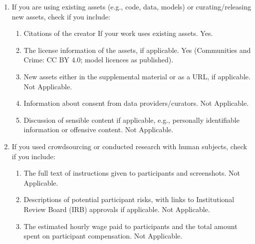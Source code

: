\documentclass[twoside]{article}
\theoremstyle{definition}
\theoremstyle{remark}
\newcommand{\1}{\mathbf{1}}
\begin{document}
\begin{enumerate}
\begin{enumerate}
  \end{enumerate}
  \item If you are using existing assets (e.g., code, data, models) or curating/releasing new assets, check if you include:
  \begin{enumerate}
    \item Citations of the creator If your work uses existing assets. Yes.
    \item The license information of the assets, if applicable. Yes (Communities and Crime: CC BY 4.0; model licences as published).
    \item New assets either in the supplemental material or as a URL, if applicable. Not Applicable.
    \item Information about consent from data providers/curators. Not Applicable.
    \item Discussion of sensible content if applicable, e.g., personally identifiable information or offensive content. Not Applicable.
  \end{enumerate}
  \item If you used crowdsourcing or conducted research with human subjects, check if you include:
  \begin{enumerate}
    \item The full text of instructions given to participants and screenshots. Not Applicable.
    \item Descriptions of potential participant risks, with links to Institutional Review Board (IRB) approvals if applicable. Not Applicable.
    \item The estimated hourly wage paid to participants and the total amount spent on participant compensation. Not Applicable.
  \end{enumerate}
\end{enumerate}

\clearpage
\appendix
\thispagestyle{empty}
\onecolumn
{}
\end{document}
